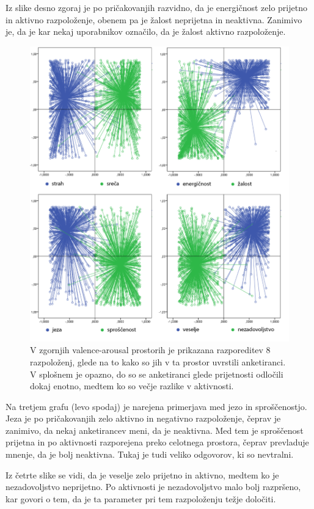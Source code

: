 \documentclass[a4paper, 12pt]{book}
\begin{document}
{Iz slike desno zgoraj je po pričakovanjih razvidno, da je energičnost zelo prijetno in aktivno razpoloženje, obenem pa je žalost neprijetna in neaktivna. Zanimivo je, da je kar nekaj uporabnikov označilo, da je žalost aktivno razpoloženje.

\begin{figure}[!hbt]
\centering
\includegraphics[width=12cm]{images/vamoodlables.png}

\caption{V zgornjih valence-arousal prostorih je prikazana razporeditev 8 razpoloženj, glede na to kako so jih v ta prostor uvrstili anketiranci. V splošnem je opazno, do so se anketiranci glede prijetnosti odločili dokaj enotno, medtem ko so večje razlike v aktivnosti.}
\label{moodperception}
\end{figure} 

Na tretjem grafu (levo spodaj) je narejena primerjava med jezo in sproščenostjo. Jeza je po pričakovanjih zelo aktivno in negativno razpoloženje, čeprav je zanimivo, da nekaj anketirancev meni, da je neaktivna. Med tem je sproščenost prijetna in po aktivnosti razporejena preko celotnega prostora, čeprav prevladuje mnenje, da je bolj neaktivna. Tukaj je tudi veliko odgovorov, ki so nevtralni.

Iz četrte slike se vidi, da je veselje zelo prijetno in aktivno, medtem ko je nezadovoljstvo neprijetno. Po aktivnosti je nezadovoljstvo malo bolj razpršeno, kar govori o tem, da je ta parameter pri tem razpoloženju težje določiti.

}
\end{document}
